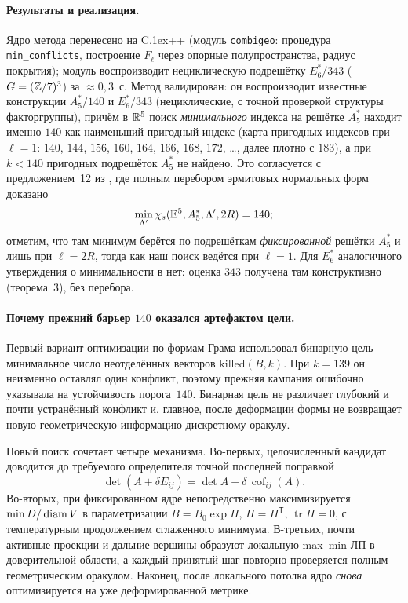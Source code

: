\paragraph{Результаты и реализация.} Ядро метода перенесено на
C\raise.1ex\hbox{\small++} (модуль \texttt{combigeo}: процедура \texttt{min\_conflicts},
построение $F_\ell$ через опорные полупространства, радиус покрытия); модуль
воспроизводит нециклическую подрешётку $E_6^*/343$ ($G=(\mathbb{Z}/7)^3$)
за ${\approx}0{,}3$~с. Метод валидирован: он воспроизводит известные
конструкции $A_5^*/140$ и $E_6^*/343$ (нециклические, с точной проверкой структуры
факторгруппы), причём в $\mathbb{R}^5$ поиск \emph{минимального} индекса на решётке
$A_5^*$ находит именно $140$ как наименьший пригодный индекс (карта пригодных
индексов при $\ell=1$: $140$, $144$, $156$, $160$, $164$, $166$, $168$,
$172$, \dots, далее плотно с $183$), а при $k<140$ пригодных подрешёток $A_5^*$ не найдено. Это согласуется с
предложением~12 из \cite{ABPR}, где полным перебором эрмитовых нормальных форм
доказано
\[
\min_{\Lambda'}\chi_s(\mathbb{E}^5,A_5^*,\Lambda',2R)=140;
\]
отметим, что там
минимум берётся по подрешёткам \emph{фиксированной} решётки $A_5^*$ и лишь при
$\ell=2R$, тогда как наш поиск ведётся при $\ell=1$. Для $E_6^*$ аналогичного
утверждения о минимальности в \cite{ABPR} нет: оценка $343$ получена там
конструктивно (теорема~3), без перебора.


\paragraph{Почему прежний барьер $140$ оказался артефактом цели.}
Первый вариант оптимизации по формам Грама использовал бинарную цель ---
минимальное число неотделённых векторов $\mathrm{killed}(B,k)$. При
$k=139$ он неизменно оставлял один конфликт, поэтому прежняя кампания ошибочно
указывала на устойчивость порога~$140$. Бинарная цель не различает глубокий и
почти устранённый конфликт и, главное, после деформации формы не возвращает
новую геометрическую информацию дискретному оракулу.

Новый поиск сочетает четыре механизма. Во-первых, целочисленный кандидат
доводится до требуемого определителя точной последней поправкой
\[
\det(A+\delta E_{ij})=\det A+\delta\,\operatorname{cof}_{ij}(A).
\]
Во-вторых, при фиксированном ядре непосредственно максимизируется
$\min D/\operatorname{diam} V$ в параметризации
$B=B_0\exp H$, $H=H^{\mathsf T}$, $\operatorname{tr}H=0$, с температурным продолжением сглаженного минимума. В-третьих, почти активные проекции и дальние вершины
образуют локальную max--min ЛП в доверительной области, а каждый принятый шаг повторно
проверяется полным геометрическим оракулом. Наконец, после локального потолка
ядро \emph{снова} оптимизируется на уже деформированной метрике.


